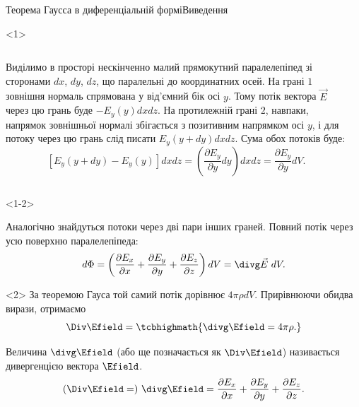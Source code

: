 \documentclass{beamer}
\begin{document}
\begin{frame}{Теорема Гаусса в диференціальній формі}{Виведення}
	\begin{onlyenv}
		\begin{columns}
			\begin{column}{0.6\linewidth}\justifying\scriptsize
				Виділимо в просторі нескінченно малий прямокутний паралелепіпед зі
				сторонами $dx$, $dy$, $dz$, що паралельні до координатних осей. На
				грані $1$ зовнішня нормаль спрямована у від'ємний бік осі $y$.
				Тому потік вектора $\vec{E}$ через цю грань буде $-E_y(y) dx dz$.
				На протилежній грані $2$, навпаки, напрямок зовнішньої нормалі
				збігається з позитивним напрямком осі $y$, і для потоку через цю
				грань слід писати $E_y(y + dy) dx dz$. Сума обох потоків буде:
				\begin{equation*}
					\left[E_y(y + dy) - E_y(y) \right] dxdz = \left( \frac{\partial
						E_y}{\partial y} dy\right) dxdz = \frac{\partial
						E_y}{\partial y} dV.
				\end{equation*}
			\end{column}
			\begin{column}{0.4\linewidth}\centering
				
			\end{column}
		\end{columns}
	\end{onlyenv}
	\begin{onlyenv}<1-2>
		\begin{block}{}
			Аналогічно знайдуться потоки через дві пари інших граней. Повний потік
			через усю поверхню паралелепіпеда:
			\begin{equation*}
				d\Phi = \left( \frac{\partial E_x}{\partial x} + \frac{\partial
					E_y}{\partial y} + \frac{\partial E_z}{\partial z} \right)  dV =
				\divg\vec{E}\ dV.
			\end{equation*}
		\end{block}
	\end{onlyenv}
	\begin{onlyenv}
		За теоремою Гауса той самий потік дорівнює $4\pi\rho dV$. Прирівнюючи обидва
		вирази, отримаємо
		\begin{equation*}
			\Div\Efield = \tcbhighmath{
				\divg\Efield = 4\pi\rho.
			}
		\end{equation*}
		\begin{block}{}\justifying
			Величина $\divg\Efield$ (або ще позначається як $\Div\Efield$)
			називається дивергенцією вектора $\Efield$.
			\begin{equation*}
				(\Div\Efield = )\ \divg\Efield = \frac{\partial
					E_x}{\partial
					x} +
				\frac{\partial
					E_y}{\partial y} + \frac{\partial E_z}{\partial z}.
			\end{equation*}
		\end{block}
	\end{onlyenv}
\end{frame}
\end{document}
